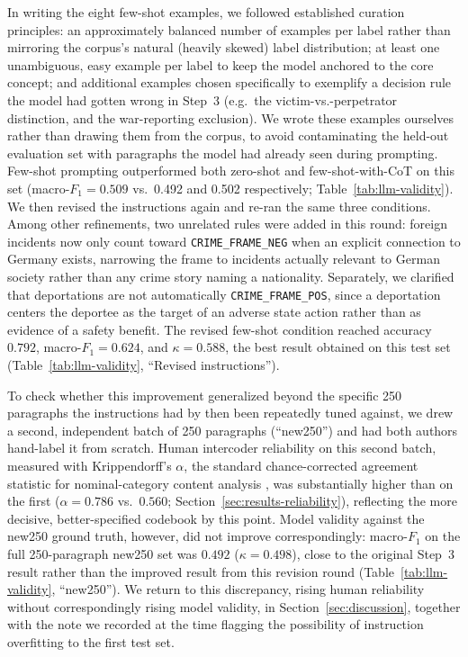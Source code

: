 \documentclass[a4paper,oneside,bibliography=totoc]{scrartcl}
\begin{document}
In writing the eight few-shot examples, we followed established curation principles: an approximately balanced number of examples per label rather than mirroring the corpus's natural (heavily skewed) label distribution; at least one unambiguous, easy example per label to keep the model anchored to the core concept; and additional examples chosen specifically to exemplify a decision rule the model had gotten wrong in Step~3 (e.g.\ the victim-vs.-perpetrator distinction, and the war-reporting exclusion). We wrote these examples ourselves rather than drawing them from the corpus, to avoid contaminating the held-out evaluation set with paragraphs the model had already seen during prompting. Few-shot prompting outperformed both zero-shot and few-shot-with-CoT on this set (macro-$F_1 = 0.509$ vs.\ 0.492 and 0.502 respectively; Table~\ref{tab:llm-validity}). We then revised the instructions again and re-ran the same three conditions. Among other refinements, two unrelated rules were added in this round: foreign incidents now only count toward \texttt{CRIME\_FRAME\_NEG} when an explicit connection to Germany exists, narrowing the frame to incidents actually relevant to German society rather than any crime story naming a nationality. Separately, we clarified that deportations are not automatically \texttt{CRIME\_FRAME\_POS}, since a deportation centers the deportee as the target of an adverse state action rather than as evidence of a safety benefit. The revised few-shot condition reached accuracy $0.792$, macro-$F_1 = 0.624$, and $\kappa = 0.588$, the best result obtained on this test set (Table~\ref{tab:llm-validity}, ``Revised instructions'').

To check whether this improvement generalized beyond the specific 250 paragraphs the instructions had by then been repeatedly tuned against, we drew a second, independent batch of 250 paragraphs (``new250'') and had both authors hand-label it from scratch. Human intercoder reliability on this second batch, measured with Krippendorff's $\alpha$, the standard chance-corrected agreement statistic for nominal-category content analysis \citep{neuendorf2017}, was substantially higher than on the first ($\alpha = 0.786$ vs.\ $0.560$; Section~\ref{sec:results-reliability}), reflecting the more decisive, better-specified codebook by this point. Model validity against the new250 ground truth, however, did not improve correspondingly: macro-$F_1$ on the full 250-paragraph new250 set was $0.492$ ($\kappa = 0.498$), close to the original Step~3 result rather than the improved result from this revision round (Table~\ref{tab:llm-validity}, ``new250''). We return to this discrepancy, rising human reliability without correspondingly rising model validity, in Section~\ref{sec:discussion}, together with the note we recorded at the time flagging the possibility of instruction overfitting to the first test set.
\end{document}
